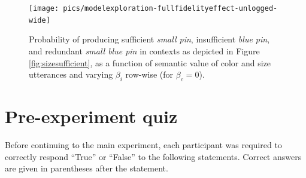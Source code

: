 \documentclass[11pt]{article}
\newcommand{\red}[1]{\textcolor{Red}{#1}}
\newcommand{\figref}[1]{Figure \ref{#1}}
\begin{document}
\begin{figure}
\centering
\texttt{[image: pics/modelexploration-fullfidelityeffect-unlogged-wide]}
\caption{Probability of producing sufficient \emph{small pin}, insufficient \emph{blue pin}, and redundant \emph{small blue pin} in contexts as depicted in \figref{fig:sizesufficient}, as a function of semantic value of color and size utterances and varying $\beta_i$ row-wise (for $ \beta_c = 0$).}
\label{fig:fullexploration}
\end{figure}

%
%


%

\section{Pre-experiment quiz}
\label{app:numdistractors}

Before continuing to the main experiment, each participant was required to correctly respond ``True'' or ``False'' to the following statements. Correct answers are given in parentheses after the statement.
\end{document}

